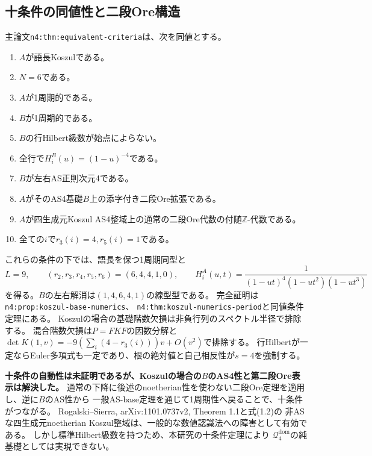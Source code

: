 \documentclass[11pt,a4paper]{ltjsarticle}
\begin{document}
\subsection{十条件の同値性と二段Ore構造}
主論文\texttt{n4:thm:equivalent-criteria}は、次を同値とする。
\begin{enumerate}
\item $A$が語長Koszulである。
\item $N=6$である。
\item $A$が1周期的である。
\item $B$が1周期的である。
\item $B$の行Hilbert級数が始点によらない。
\item 全行で$H_i^B(u)=(1-u)^{-4}$である。
\item $B$が左右AS正則次元4である。
\item $A$がそのAS4基礎$B$上の添字付き二段Ore拡張である。
\item $A$が四生成元Koszul AS4整域上の通常の二段Ore代数の付随$\mathbb Z$-代数である。
\item 全ての$i$で$r_3(i)=4,r_5(i)=1$である。
\end{enumerate}
これらの条件の下では、語長を保つ1周期同型と
\[
L=9,\qquad (r_2,r_3,r_4,r_5,r_6)=(6,4,4,1,0),\qquad
H_i^A(u,t)=\frac1{(1-ut)^4(1-ut^2)(1-ut^3)}
\]
を得る。$B$の左右解消は$(1,4,6,4,1)$の線型型である。
完全証明は\texttt{n4:prop:koszul-base-numerics}、
\texttt{n4:thm:koszul-numerics-period}と同値条件定理にある。
Koszulの場合の基礎階数欠損は非負行列のスペクトル半径で排除する。
混合階数欠損は$P=FKF$の因数分解と
$\det K(1,v)=-9(\sum_i(4-r_3(i)))v+O(v^2)$で排除する。
行Hilbertが一定ならEuler多項式も一定であり、根の絶対値と自己相反性が$s=4$を強制する。

\textbf{十条件の自動性は未証明であるが、Koszulの場合の$B$のAS4性と第二段Ore表示は解決した。}
通常の下降に後述のnoetherian性を使わない二段Ore定理を適用し、逆に$B$のAS性から
一般AS-base定理を通じて1周期性へ戻ることで、十条件がつながる。
Rogalski--Sierra, arXiv:1101.0737v2, Theorem 1.1と式(1.2)の
非ASな四生成元noetherian Koszul整域は、一般的な数値認識法への障害として有効である。
しかし標準Hilbert級数を持つため、本研究の十条件定理により
$\mathcal Q_4^{\mathrm{dom}}$の純基礎としては実現できない。
\end{document}
